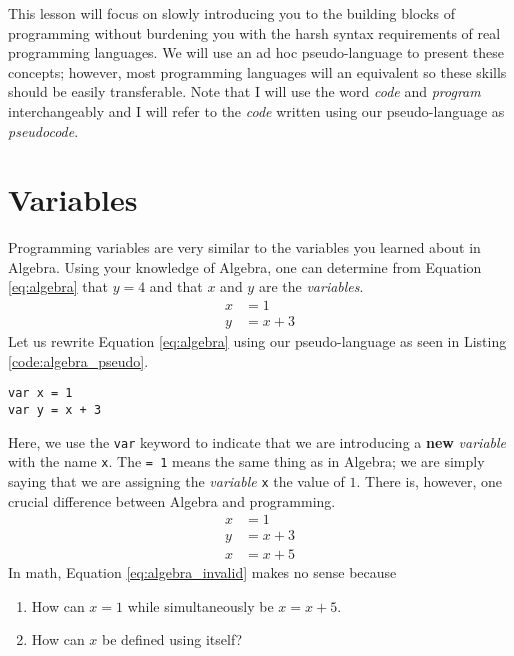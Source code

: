 \documentclass{article}
\begin{document}
This lesson will focus on slowly introducing you to the building blocks of programming without burdening you with the harsh syntax requirements of real programming languages.
We will use an ad hoc pseudo-language to present these concepts; however, most programming languages will an equivalent so these skills should be easily transferable.
Note that I will use the word \textit{code} and \textit{program} interchangeably and I will refer to the \textit{code} written using our pseudo-language as \textit{pseudocode}.

\section{Variables}

Programming variables are very similar to the variables you learned about in Algebra.
Using your knowledge of Algebra, one can determine from Equation \ref{eq:algebra} that $y = 4$ and that $x$ and $y$ are the \textit{variables}.
\begin{equation}
\begin{aligned}
x & = 1 \\
y & = x + 3
\end{aligned}
\label{eq:algebra}
\end{equation}
Let us rewrite Equation \ref{eq:algebra} using our pseudo-language as seen in Listing \ref{code:algebra_pseudo}.
\begin{lstlisting}[caption={The equivalent of Equation \ref{eq:algebra} in our pseudo-language.}, label={code:algebra_pseudo}]
var x = 1
var y = x + 3
\end{lstlisting}
Here, we use the \lstinline{var} keyword to indicate that we are introducing a \textbf{new} \textit{variable} with the name \lstinline{x}.
The \lstinline{= 1} means the same thing as in Algebra; we are simply saying that we are assigning the \textit{variable} \lstinline{x} the value of $1$.
There is, however, one crucial difference between Algebra and programming.
\begin{equation}
\begin{aligned}
x & = 1 \\
y & = x + 3 \\
x & = x + 5
\end{aligned}
\label{eq:algebra_invalid}
\end{equation}
In math, Equation \ref{eq:algebra_invalid} makes no sense because
\begin{enumerate}
\item How can $x = 1$ while simultaneously be $x = x + 5$.
\item How can $x$ be defined using itself?
\end{enumerate}
\end{document}
